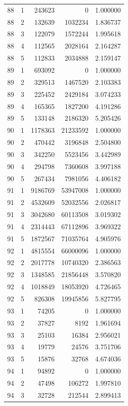 \begin{longtable}{rrrrr}
88 & 1 & 243623 & 0 & 1.000000 \\
88 & 2 & 132639 & 1032234 & 1.836737 \\
88 & 3 & 122079 & 1572244 & 1.995618 \\
88 & 4 & 112565 & 2028164 & 2.164287 \\
88 & 5 & 112833 & 2034888 & 2.159147 \\
89 & 1 & 693092 & 0 & 1.000000 \\
89 & 2 & 329513 & 1467520 & 2.103383 \\
89 & 3 & 225452 & 2429184 & 3.074233 \\
89 & 4 & 165365 & 1827200 & 4.191286 \\
89 & 5 & 133148 & 2186320 & 5.205426 \\
90 & 1 & 1178363 & 21233592 & 1.000000 \\
90 & 2 & 470442 & 3196848 & 2.504800 \\
90 & 3 & 342250 & 5523456 & 3.442989 \\
90 & 4 & 294798 & 7360608 & 3.997188 \\
90 & 5 & 267434 & 7981056 & 4.406182 \\
91 & 1 & 9186769 & 53947008 & 1.000000 \\
91 & 2 & 4532609 & 52032556 & 2.026817 \\
91 & 3 & 3042680 & 60113508 & 3.019302 \\
91 & 4 & 2314443 & 67112896 & 3.969322 \\
91 & 5 & 1872567 & 71035764 & 4.905976 \\
92 & 1 & 4815554 & 66000096 & 1.000000 \\
92 & 2 & 2017778 & 10740320 & 2.386563 \\
92 & 3 & 1348585 & 21856448 & 3.570820 \\
92 & 4 & 1018849 & 18053920 & 4.726465 \\
92 & 5 & 826308 & 19945856 & 5.827795 \\
93 & 1 & 74205 & 0 & 1.000000 \\
93 & 2 & 37827 & 8192 & 1.961694 \\
93 & 3 & 25103 & 16384 & 2.956021 \\
93 & 4 & 19779 & 24576 & 3.751706 \\
93 & 5 & 15876 & 32768 & 4.674036 \\
94 & 1 & 94892 & 0 & 1.000000 \\
94 & 2 & 47498 & 106272 & 1.997810 \\
94 & 3 & 32728 & 212544 & 2.899413 \\

\end{longtable}
